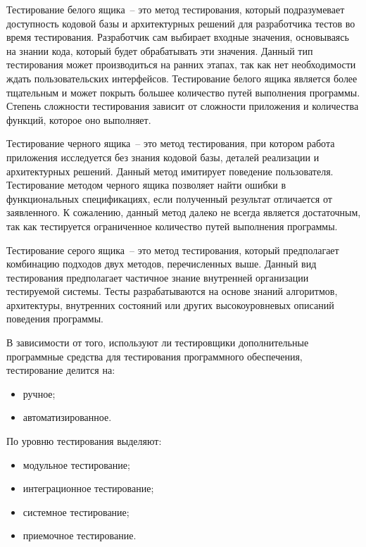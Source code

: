 Тестирование белого ящика~-- это метод тестирования, который 
подразумевает доступность кодовой базы и архитектурных решений для 
разработчика тестов во время тестирования. Разработчик сам выбирает 
входные значения, основываясь на знании кода, который будет обрабатывать 
эти значения. Данный тип тестирования может производиться на ранних 
этапах, так как нет необходимости ждать пользовательских интерфейсов. 
Тестирование белого ящика является более тщательным и может покрыть 
большее количество путей выполнения программы. Степень сложности 
тестирования зависит от сложности приложения и количества функций, 
которое оно выполняет.

Тестирование черного ящика~-- это метод тестирования, при котором 
работа приложения исследуется без знания кодовой базы, деталей реализации 
и архитектурных решений. Данный метод имитирует поведение пользователя. 
Тестирование методом черного ящика позволяет найти ошибки в 
функциональных спецификациях, если полученный результат отличается от 
заявленного. К сожалению, данный метод далеко не всегда является 
достаточным, так как тестируется ограниченное количество путей выполнения 
программы.

Тестирование серого ящика~-- это метод тестирования, который 
предполагает комбинацию подходов двух методов, перечисленных выше. 
Данный вид тестирования предполагает частичное знание внутренней 
организации тестируемой системы. Тесты разрабатываются на основе знаний 
алгоритмов, архитектуры, внутренних состояний или других 
высокоуровневых описаний поведения программы.

В зависимости от того, используют ли тестировщики дополнительные 
программные средства для тестирования программного обеспечения, 
тестирование делится на:

\begin{itemize}
    \item ручное;
    \item автоматизированное.
\end{itemize}

По уровню тестирования выделяют:

\begin{itemize}
    \item модульное тестирование;
    \item интеграционное тестирование;
    \item системное тестирование;
    \item приемочное тестирование.
\end{itemize}

